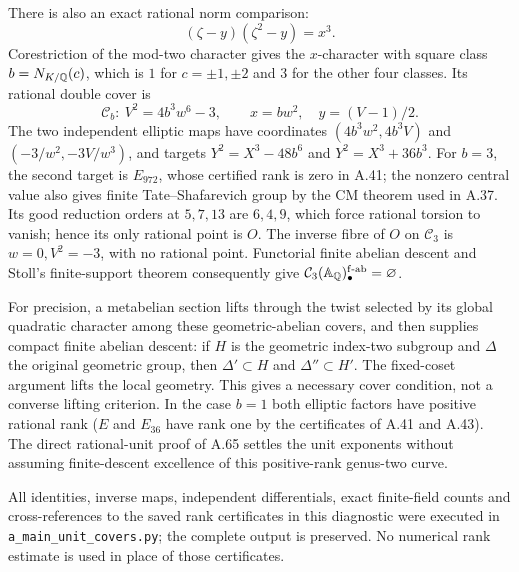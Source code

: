 There is also an exact rational norm comparison:
\[
 (\zeta-y)(\zeta^2-y)=x^3.
\]
Corestriction of the mod-two character gives the
$x$-character with square class $b=N_{K/\mathbb Q}(c)$,
which is $1$ for $c=\pm1,\pm2$ and $3$ for the
other four classes. Its rational double cover is
\[
 \mathcal C_b:\ V^2=4b^3w^6-3,\qquad
 x=bw^2,\quad y=(V-1)/2.
 \tag{A65.18}
\]
The two independent elliptic maps have coordinates
$(4b^3w^2,4b^3V)$ and $(-3/w^2,-3V/w^3)$,
and targets $Y^2=X^3-48b^6$ and
$Y^2=X^3+36b^3$. For $b=3$, the second target is
$E_{972}$, whose certified rank is zero in A.41;
the nonzero central value also gives finite
Tate--Shafarevich group by the CM theorem used in A.37.
Its good reduction orders at $5,7,13$ are $6,4,9$,
which force rational torsion to vanish; hence its
only rational point is $O$. The inverse fibre of
$O$ on $\mathcal C_3$ is $w=0,V^2=-3$, with no
rational point. Functorial finite abelian descent
and Stoll's finite-support theorem consequently
give $\mathcal C_3(\mathbb A_\mathbb Q)_\bullet^{\rm f\text{-}ab}
=\varnothing$.

For precision, a metabelian section lifts through
the twist selected by its global quadratic
character among these geometric-abelian covers, and then
supplies compact finite abelian descent: if $H$
is the geometric index-two subgroup and $\Delta$
the original geometric group, then
$\Delta'\subset H$ and $\Delta''\subset H'$.
The fixed-coset argument lifts the local geometry.
This gives a necessary cover condition, not a
converse lifting criterion. In the case $b=1$
both elliptic factors have positive rational rank
($E$ and $E_{36}$ have rank one by the certificates
of A.41 and A.43). The direct rational-unit proof
of A.65 settles the unit exponents without
assuming finite-descent excellence of this
positive-rank genus-two curve.

All identities, inverse maps, independent
differentials, exact finite-field counts and
cross-references to the saved rank certificates
in this diagnostic were executed in
\texttt{a\_main\_unit\_covers.py}; the complete
output is preserved. No numerical rank estimate
is used in place of those certificates.
